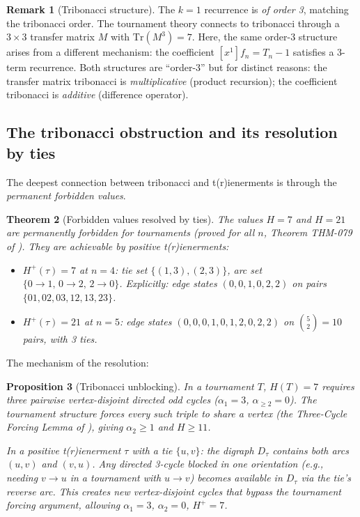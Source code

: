 \documentclass[12pt,reqno]{amsart}
\newtheorem{theorem}{Theorem}[section]
\newtheorem{proposition}[theorem]{Proposition}
\theoremstyle{definition}
\newtheorem{remark}[theorem]{Remark}
\theoremstyle{plain}
\begin{document}
\begin{remark}[Tribonacci structure]
The $k=1$ recurrence is \emph{of order 3}, matching the tribonacci order.
The tournament theory connects to tribonacci through a $3\times3$ transfer
matrix $M$ with $\mathrm{Tr}(M^3)=7$.  Here, the same order-3 structure
arises from a different mechanism: the coefficient $[x^1]f_n=T_n-1$ satisfies
a 3-term recurrence.  Both structures are ``order-3'' but for distinct reasons:
the transfer matrix tribonacci is \emph{multiplicative} (product recursion);
the coefficient tribonacci is \emph{additive} (difference operator).
\end{remark}

\subsection{The tribonacci obstruction and its resolution by ties}
\label{ssec:tribonacci-resolution}

The deepest connection between tribonacci and t(r)ienerments is through
the \emph{permanent forbidden values}.

\begin{theorem}[Forbidden values resolved by ties]\label{thm:forbidden}
The values $H=7$ and $H=21$ are permanently forbidden for tournaments
(proved for all $n$, Theorem THM-079 of \cite{Cassidy2026}).
They are \emph{achievable} by positive t(r)ienerments:
\begin{itemize}
\item $H^+(\tau)=7$ at $n=4$: tie set $\{(1,3),(2,3)\}$, arc set $\{0\to1,\,0\to2,\,2\to0\}$.
  Explicitly: edge states $(0,0,1,0,2,2)$ on pairs $\{01,02,03,12,13,23\}$.
\item $H^+(\tau)=21$ at $n=5$: edge states $(0,0,0,1,0,1,2,0,2,2)$ on $\binom{5}{2}=10$ pairs,
  with 3 ties.
\end{itemize}
\end{theorem}

The mechanism of the resolution:

\begin{proposition}[Tribonacci unblocking]\label{prop:unblocking}
In a tournament $T$, $H(T)=7$ requires three pairwise vertex-disjoint
directed odd cycles ($\alpha_1=3$, $\alpha_{\ge 2}=0$).  The tournament
structure forces every such triple to share a vertex (the Three-Cycle Forcing
Lemma of \cite{Cassidy2026}), giving $\alpha_2\ge 1$ and $H\ge 11$.

In a positive t(r)ienerment $\tau$ with a tie $\{u,v\}$: the digraph
$D_\tau$ contains \emph{both} arcs $(u,v)$ and $(v,u)$.  Any directed
3-cycle blocked in one orientation (e.g., needing $v\to u$ in a tournament
with $u\to v$) becomes available in $D_\tau$ via the tie's reverse arc.
This creates new vertex-disjoint cycles that bypass the tournament forcing
argument, allowing $\alpha_1=3$, $\alpha_2=0$, $H^+=7$.
\end{proposition}
\end{document}
